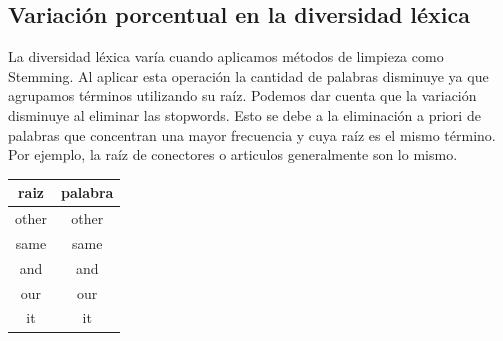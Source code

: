 \documentclass[conference]{IEEEtran}
\begin{document}
\subsection{Variación porcentual en la diversidad léxica}
La diversidad léxica varía cuando aplicamos métodos de limpieza como Stemming. Al aplicar esta operación la cantidad de palabras disminuye ya que agrupamos términos utilizando su raíz. Podemos dar cuenta que la variación disminuye al eliminar las stopwords. Esto se debe a la eliminación a priori de palabras que concentran una mayor frecuencia y cuya raíz es el mismo término. Por ejemplo, la raíz de conectores o articulos generalmente son lo mismo.
\begin{center}
\begin{tabular}{|c|c|}
\hline 
\textbf{raiz} & \textbf{palabra} \\ 
\hline 
other & other \\ 
\hline 
same & same \\ 
\hline 
and & and \\ 
\hline 
our & our \\ 
\hline 
it & it \\ 
\hline 
\end{tabular} 
\end{center}
\end{document}
